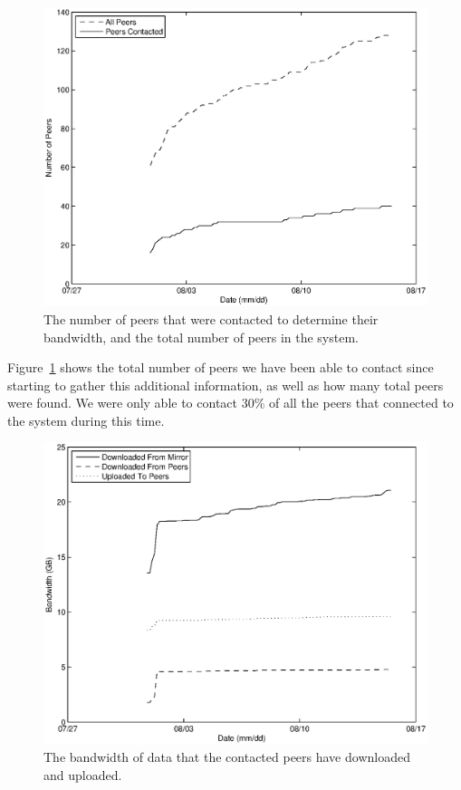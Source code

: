 \documentclass[conference]{IEEEtran}
\begin{document}
\begin{figure}
\centering
\includegraphics[width=\columnwidth]{AptP2PDownloaded-peers.eps}
\caption{The number of peers that were contacted to determine their
bandwidth, and the total number of peers in the system.}
\label{down_peers}
\end{figure}

Figure~\ref{down_peers} shows the total number of peers we have been
able to contact since starting to gather this additional
information, as well as how many total peers were found. We were
only able to contact 30\% of all the peers that connected to the
system during this time.

\begin{figure}
\centering
\includegraphics[width=\columnwidth]{AptP2PDownloaded-bw.eps}
\caption{The bandwidth of data that the contacted peers have
downloaded and uploaded.}
\label{down_bw}
\end{figure}
\end{document}
